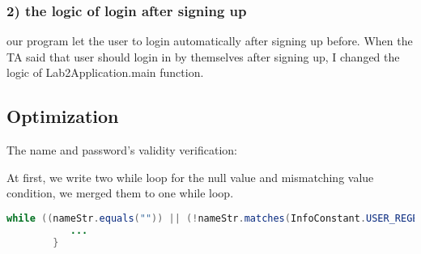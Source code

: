 \documentclass[./report.tex]{subfiles}
\begin{document}
		\subsubsection{2) the logic of login after signing up}
		\par our program let the user to login automatically after signing up before. When the TA said that user should login in by themselves after signing up, I changed the logic of Lab2Application.main function.

	\subsection{Optimization}
	\par The name and password's validity verification:
	\par At first, we write two while loop  for the null value and mismatching value condition, we merged them to one while loop.
\begin{lstlisting}[language=java]
 while ((nameStr.equals("")) || (!nameStr.matches(InfoConstant.USER_REGEX))) {
           ...
        }
\end{lstlisting}
\end{document}

